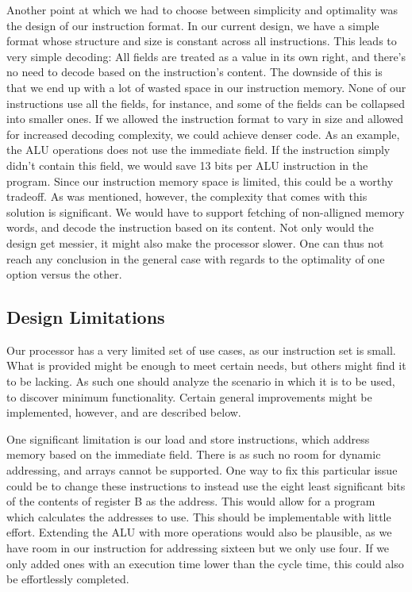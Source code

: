 \documentclass[11pt]{article}
\begin{document}
Another point at which we had to choose between simplicity and
optimality was the design of our instruction format. In our current
design, we have a simple format whose structure and size is constant
across all instructions. This leads to very simple decoding: All
fields are treated as a value in its own right, and there's no need to
decode based on the instruction's content. The downside of this is
that we end up with a lot of wasted space in our instruction
memory. None of our instructions use all the fields, for instance, and
some of the fields can be collapsed into smaller ones. If we allowed
the instruction format to vary in size and allowed for increased
decoding complexity, we could achieve denser code. As an example, the
ALU operations does not use the immediate field. If the instruction
simply didn't contain this field, we would save 13 bits per ALU
instruction in the program. Since our instruction memory space is
limited, this could be a worthy tradeoff. As was mentioned, however,
the complexity that comes with this solution is significant. We would
have to support fetching of non-alligned memory words, and decode the
instruction based on its content. Not only would the design get
messier, it might also make the processor slower. One can thus not
reach any conclusion in the general case with regards to the
optimality of one option versus the other.

\subsection{Design Limitations}
\label{subsec:limitations}
Our processor has a very limited set of use cases, as our instruction
set is small. What is provided might be enough to meet certain needs,
but others might find it to be lacking. As such one should analyze the
scenario in which it is to be used, to discover minimum
functionality. Certain general improvements might be implemented,
however, and are described below.

One significant limitation is our load and store instructions, which
address memory based on the immediate field. There is as such no room
for dynamic addressing, and arrays cannot be supported. One way to fix
this particular issue could be to change these instructions to instead
use the eight least significant bits of the contents of register B as
the address. This would allow for a program which calculates the
addresses to use. This should be implementable with little
effort. Extending the ALU with more operations would also be
plausible, as we have room in our instruction for addressing sixteen
but we only use four. If we only added ones with an execution time
lower than the cycle time, this could also be effortlessly completed.
\end{document}
